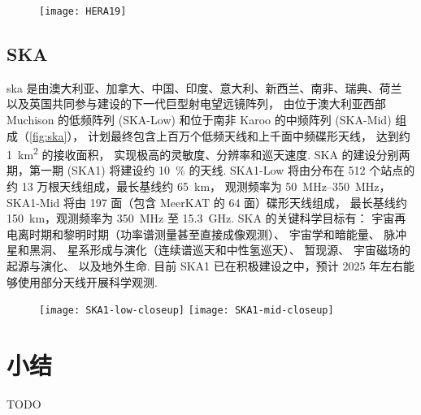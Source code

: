 \begin{figure}
  \centering
  \texttt{[image: HERA19]}
  \label{fig:hera}
\end{figure}

\subsection{SKA}

\acf{ska} 是由澳大利亚、加拿大、中国、印度、意大利、新西兰、南非、瑞典、荷兰
以及英国共同参与建设的下一代巨型射电望远镜阵列，
由位于澳大利亚西部 Muchison 的低频阵列 (SKA-Low)
和位于南非 Karoo 的中频阵列 (SKA-Mid) 组成（\autoref{fig:ska}），
计划最终包含上百万个低频天线和上千面中频碟形天线，
达到约 \SI{1}{\km\squared} 的接收面积，
实现极高的灵敏度、分辨率和巡天速度.
SKA 的建设分别两期，第一期 (SKA1) 将建设约 \SI{10}{\percent} 的天线.
SKA1-Low 将由分布在 512 个站点的约 13 万根天线组成，最长基线约 \SI{65}{\km}，
观测频率为 \SIrange{50}{350}{\MHz}，
SKA1-Mid 将由 197 面（包含 MeerKAT 的 64 面）碟形天线组成，
最长基线约 \SI{150}{\km}，观测频率为 \SI{350}{\MHz} 至 \SI{15.3}{\GHz}.
SKA 的关键科学目标有\cite{braun2015}：
宇宙再电离时期和黎明时期（功率谱测量甚至直接成像观测）\cite{mellema2013,mellema2015,koopmans2015}、
宇宙学和暗能量\cite{maartens2015,santos2015}、
脉冲星和黑洞\cite{kramer2015}、
星系形成与演化（连续谱巡天和中性氢巡天）\cite{prandoni2015,staveley2015}、
暂现源\cite{fender2015}、
宇宙磁场的起源与演化\cite{johnston2015}、
以及地外生命\cite{hoare2015}.
目前 SKA1 已在积极建设之中，预计 2025 年左右能够使用部分天线开展科学观测.

\begin{figure}
  \centering
  \texttt{[image: SKA1-low-closeup]}%
  \texttt{[image: SKA1-mid-closeup]}
  \label{fig:ska}
\end{figure}


\section{小结}

TODO



